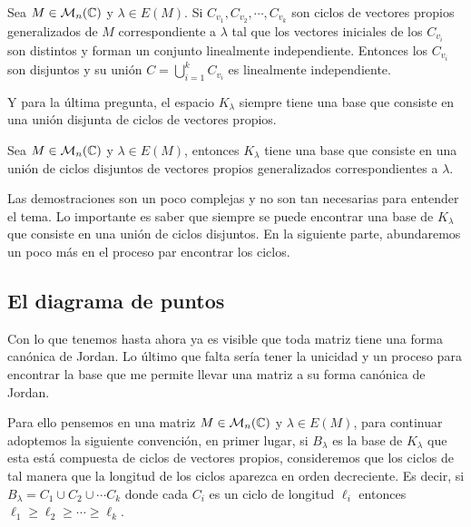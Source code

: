 \begin{teor} \label{teor:IndepCiclos}
  Sea $M \in \mathcal{M}_n(\mathbb{C})$ y $\lambda\in E(M)$. Si $C_{v_1}, C_{v_2}, \cdots, C_{v_k}$ son ciclos de vectores propios generalizados de $M$ correspondiente a $\lambda$ tal que los vectores iniciales de los $C_{v_i}$ son distintos y forman un conjunto linealmente independiente. Entonces los $C_{v_i}$ son disjuntos y su unión $C = \bigcup_{i=1}^k C_{v_i}$ es linealmente independiente.
\end{teor}

 Y para la última pregunta, el espacio $K_\lambda$ siempre tiene una base que consiste en una unión disjunta de ciclos de vectores propios.

\begin{teor}
  Sea $M \in \mathcal{M}_n(\mathbb{C})$ y $\lambda \in E(M)$, entonces $K_\lambda$ tiene una base que consiste en una unión de ciclos disjuntos de vectores propios generalizados correspondientes a $\lambda$.
\end{teor}

Las demostraciones son un poco complejas y no son tan necesarias para entender el tema. Lo importante es saber que siempre se puede encontrar una base de $K_\lambda$ que consiste en una unión de ciclos disjuntos. En la siguiente parte, abundaremos un poco más en el proceso par encontrar los ciclos.



\subsection{El diagrama de puntos}

Con lo que tenemos hasta ahora ya es visible que toda matriz tiene una forma canónica de Jordan. Lo último que falta sería tener la unicidad y un proceso para encontrar la base que me permite llevar una matriz a su forma canónica de Jordan.

Para ello pensemos en una matriz $M\in\mathcal{M}_n(\mathbb{C})$ y $\lambda \in E(M)$, para continuar adoptemos la siguiente convención, en primer lugar, si $B_\lambda$ es la base de $K_\lambda$ que esta está compuesta de ciclos de vectores propios, consideremos que los ciclos de tal manera que la longitud de los ciclos aparezca en orden decreciente. Es decir, si $B_\lambda = C_1 \cup C_2 \cup \cdots C_k$ donde cada $C_i$ es un ciclo de longitud $\ell_i$ entonces $\ell_1 \geq \ell_2 \geq \cdots \geq \ell_k$.


